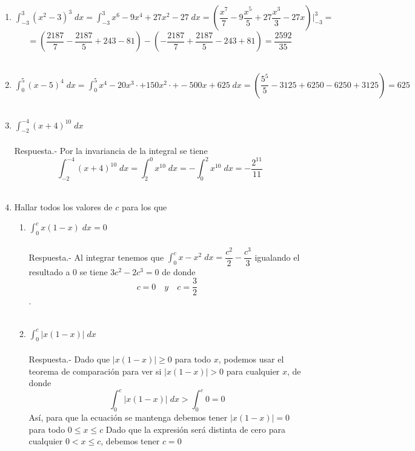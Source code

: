 \begin{enumerate}[\bfseries 1.]
    \item $\displaystyle\int_{-3}^3 (x^2-3)^3 \; dx = \int_{-3}^3 x^6 - 9x^4 + 27x^2 - 27 \; dx = \left(\dfrac{x^7}{7}-9\dfrac{x^5}{5}+27\dfrac{x^3}{3}-27x\right)\bigg|_{-3}^3 =$
	$$=\left(\dfrac{2187}{7}-\dfrac{2187}{5}+243-81\right)-\left(-\dfrac{2187}{7}+\dfrac{2187}{5}-243+81\right)=\dfrac{2592}{35}$$\\


    \item $\displaystyle\int_0^5 (x-5)^4 \; dx = \int_0^5 x^4 - 20x^3\cdot + 150 x^2\cdot + - 500x + 625 \; dx = \left(\dfrac{5^5}{5} - 3125 + 6250 - 6250 + 3125 \right) = 625$\\\\

    \item $\displaystyle\int_{-2}^{-4} (x + 4)^{10} \; dx$\\\\
	Respuesta.-\; Por la invariancia de la integral se tiene 
	$$\int_{-2}^{-4} (x+4)^{10} \; dx = \int_2^0 x^{10} \; dx = - \int_0^2 x^{10} \; dx = - \dfrac{2^{11}}{11}$$\\

    \item Hallar todos los valores de $c$ para los que

    \begin{enumerate}[\bfseries (a)]

	\item $\displaystyle\int_0^c x(1-x) \; dx = 0$\\\\
	    Respuesta.-\; Al integrar tenemos que $\displaystyle\int_0^c x - x^2 \; dx = \dfrac{c^2}{2} - \dfrac{c^3}{3}$ igualando el resultado a $0$ se tiene $3c^2 - 2c^3 = 0$ de donde $$c=0 \quad y \quad c=\dfrac{3}{2}$$.\\\\

	\item $\displaystyle\int_0^c |x(1-x)| \; dx$\\\\
	    Respuesta.-\; Dado que $|x(1-x)|\geq 0$ para todo $x$, podemos usar el teorema de comparación para ver si $|x(1-x)|>0$ para cualquier $x$, de donde $$\int_0^c |x(1-x)| \; dx > \int_0^c 0 = 0$$
	    Así, para que la ecuación se mantenga debemos tener $|x(1-x)|=0$ para todo $0\leq x \leq c$ Dado que la expresión será distinta de cero para cualquier $0<x\leq c$, debemos tener $c=0$\\\\\\\\
    \end{enumerate}


\end{enumerate}
